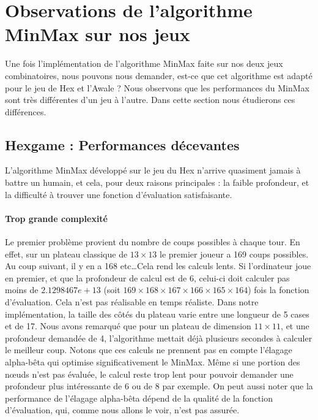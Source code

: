 




\section{Observations de l'algorithme MinMax sur nos jeux}
Une fois l'implémentation de l'algorithme MinMax faite sur nos deux
jeux combinatoires, nous pouvons nous demander, est-ce que cet algorithme est adapté pour le jeu de Hex et l'Awale ?
Nous observons que les performances du MinMax sont très différentes d'un jeu à l'autre. Dans cette section nous étudierons ces différences.

\subsection{Hexgame : Performances décevantes}
L'algorithme MinMax développé sur le jeu du Hex n'arrive quasiment jamais à battre un humain, et cela, pour
deux raisons principales : la faible profondeur, et la difficulté à trouver une fonction d'évaluation satisfaisante.

\paragraph{Trop grande complexité} Le premier problème provient du nombre de coups possibles à chaque tour.
En effet, sur un plateau classique de $13\times13$ le premier joueur a 169 coups possibles. Au coup suivant, il y en a 168 etc\dots Cela rend les calculs lents. 
Si l'ordinateur joue en premier, et que la profondeur de calcul est de 6, celui-ci doit calculer pas moins de $2.1298467e+13$ (soit $169\times168\times167\times166\times165\times164$)
fois la fonction d'évaluation. Cela n'est pas réalisable en temps réaliste. Dans notre implémentation, la taille des côtés du plateau varie entre
une longueur de 5 cases et de 17. Nous avons remarqué que pour un plateau de dimension $11\times11$, et une profondeur demandée de 4, l'algorithme
mettait déjà plusieurs secondes à calculer le meilleur coup. Notons que ces calculs ne prennent pas en compte l'élagage alpha-bêta
qui optimise significativement le MinMax. Même si une portion des nœuds n'est pas évaluée, le calcul reste trop lent pour pouvoir demander une
profondeur plus intéressante de 6 ou de 8 par exemple.
On peut aussi noter que la performance de l'élagage alpha-bêta dépend de la qualité de la fonction d'évaluation, qui, comme nous allons
le voir, n'est pas assurée.


